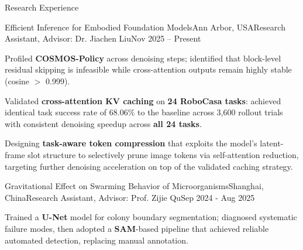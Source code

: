 \documentclass{resume} %
\begin{document}
\begin{rSection}{Research Experience}

\begin{rSubsection}{Efficient Inference for Embodied Foundation Models}{Ann Arbor, USA}{Research Assistant, Advisor: Dr. Jiachen Liu}{Nov 2025 -- Present}
\item Profiled \textbf{COSMOS-Policy} across denoising steps; identified that block-level residual skipping is infeasible while cross-attention outputs remain highly stable (cosine $>$ 0.999).
\item Validated \textbf{cross-attention KV caching} on \textbf{24 RoboCasa tasks}: achieved  identical task success rate of 68.06\% to the baseline across 3,600 rollout trials with consistent denoising speedup across \textbf{all 24 tasks}.
\item Designing \textbf{task-aware token compression} that exploits the model's latent-frame slot structure to selectively prune image tokens via self-attention reduction, targeting further denoising acceleration on top of the validated caching strategy.
\end{rSubsection}

\begin{rSubsection}{Gravitational Effect on Swarming Behavior of Microorganisms}{Shanghai, China}{Research Assistant, Advisor: Prof. Zijie Qu}{Sep 2024 - Aug 2025}
\item Trained a \textbf{U-Net} model for colony boundary segmentation; diagnosed systematic failure modes, then adopted a \textbf{SAM}-based pipeline that achieved reliable automated detection, replacing manual annotation.
\end{rSubsection}


\end{rSection}

\end{document}
